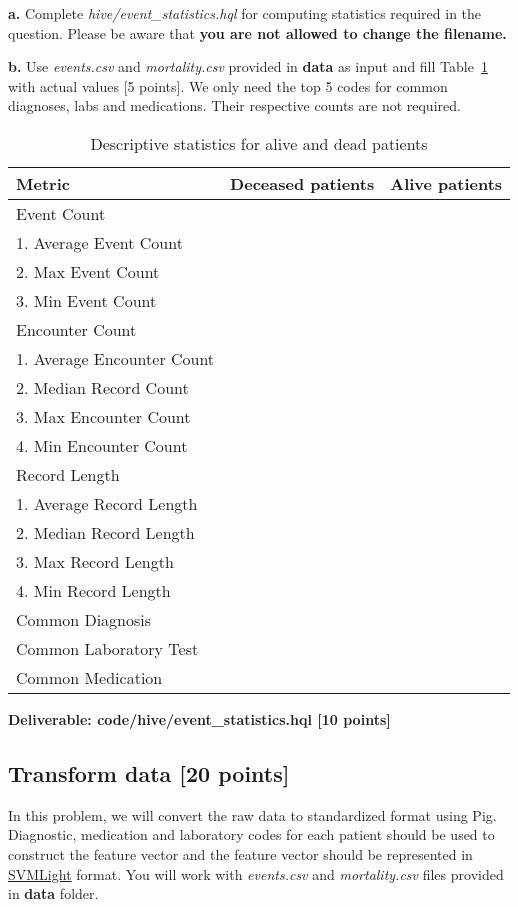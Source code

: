 \documentclass[12pt]{article}
\begin{document}
\textbf{a.} Complete \textit{hive/event\_statistics.hql} for computing statistics required in the question. Please be aware that \textbf{\color{red} you are not allowed to change the filename.} 

\textbf{b.} Use \textit{events.csv} and \textit{mortality.csv} provided in \textbf{data} as input and fill Table~\ref{tbl:stat} with actual values [5 points]. We only need the top 5 codes for common diagnoses, labs and medications. Their respective counts are not required. \\

\begin{table}[th]
\centering
\begin{tabular}{@{}l|l|l}
\toprule
Metric & Deceased patients & Alive patients  \\ \hline
Event Count & &  \\ 
1. Average Event Count && \\
2. Max Event Count  &&\\
3. Min Event Count  &&\\ \hline

Encounter Count & &  \\ 
1. Average Encounter Count  &&\\
2. Median Record Count &&\\
3. Max Encounter Count  &&\\
4. Min Encounter Count  &&\\ \hline

Record Length & &  \\ 
1. Average Record Length &&\\
2. Median Record Length &&\\
3. Max Record Length&& \\
4. Min Record Length&& \\ \hline

Common Diagnosis & &  \\ \hline

Common Laboratory Test & &  \\ \hline

Common Medication & &  \\ 
\bottomrule
\end{tabular}
\caption{Descriptive statistics for alive and dead patients\label{tbl:stat}}
\end{table} 

\textbf{Deliverable: code/hive/event\_statistics.hql [10 points]}

\subsection{Transform data [20 points]}
In this problem, we will convert the raw data to standardized format using Pig. Diagnostic, medication and laboratory codes for each patient should be used to construct the feature vector and the feature vector should be represented in \href{http://svmlight.joachims.org/}{SVMLight} format. You will work with \textit{events.csv} and \textit{mortality.csv} files provided in \textbf{data} folder. 
\end{document}
